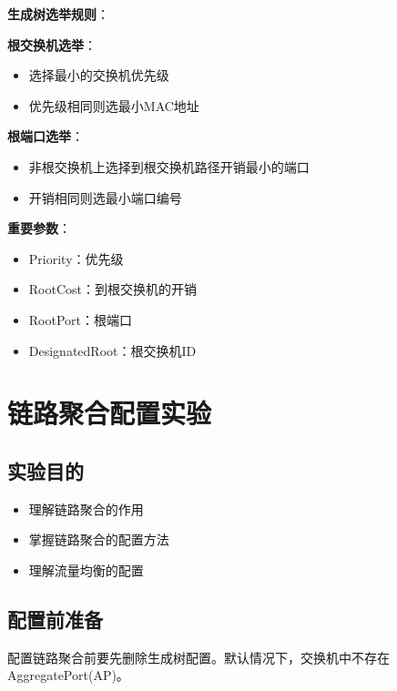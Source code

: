 \documentclass[12pt,a4paper]{ctexart}
\begin{document}
\begin{keybox}
\textbf{生成树选举规则}：

\textbf{根交换机选举}：
\begin{itemize}[itemsep=0pt]
    \item 选择最小的交换机优先级
    \item 优先级相同则选最小MAC地址
\end{itemize}

\textbf{根端口选举}：
\begin{itemize}[itemsep=0pt]
    \item 非根交换机上选择到根交换机路径开销最小的端口
    \item 开销相同则选最小端口编号
\end{itemize}

\textbf{重要参数}：
\begin{itemize}[itemsep=0pt]
    \item Priority：优先级
    \item RootCost：到根交换机的开销
    \item RootPort：根端口
    \item DesignatedRoot：根交换机ID
\end{itemize}
\end{keybox}


\section{链路聚合配置实验}

\subsection{实验目的}

\begin{itemize}[leftmargin=2em,itemsep=0pt]
    \item 理解链路聚合的作用
    \item 掌握链路聚合的配置方法
    \item 理解流量均衡的配置
\end{itemize}

\subsection{配置前准备}

配置链路聚合前要先删除生成树配置。默认情况下，交换机中不存在AggregatePort(AP)。
\end{document}
